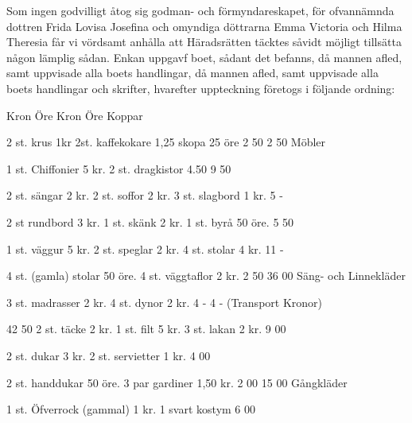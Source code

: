 Som ingen godvilligt åtog sig godman- och förmyndareskapet, för ofvannämnda dottren Frida Lovisa Josefina och omyndiga döttrarna Emma Victoria och Hilma Theresia får vi vördsamt anhålla att Häradsrätten täcktes såvidt möjligt tillsätta någon lämplig sådan. Enkan uppgavf boet, sådant det befanns, då mannen afled, samt uppvisade alla boets handlingar, då mannen afled, samt uppvisade alla boets handlingar och skrifter, hvarefter uppteckning företogs i följande ordning:




	Kron
	Öre
	Kron
	Öre
	Koppar
	

	

	

	

	2 st. krus 1kr 2st. kaffekokare 1,25 skopa 25 öre
	2
	50
	2
	50
	Möbler
	

	

	

	

	1 st. Chiffonier 5 kr. 2 st. dragkistor 4.50 
	9
	50
	

	

	2 st. sängar 2 kr. 2 st. soffor 2 kr. 3 st. slagbord  1 kr.
	5
	-
	

	

	2 st rundbord 3 kr. 1 st. skänk 2 kr. 1 st. byrå 50 öre.
	5
	50
	

	

	1 st. väggur 5 kr. 2 st. speglar 2 kr. 4 st. stolar 4 kr.
	11
	-
	

	

	4 st. (gamla) stolar 50 öre. 4 st. väggtaflor 2 kr. 
	2
	50
	36
	00
	Säng- och Linnekläder
	

	

	

	

	3 st. madrasser 2 kr. 4 st. dynor 2 kr. 
	4
	-
	4
	-
	(Transport Kronor)
	

	

	42
	50
	2 st. täcke 2 kr. 1 st. filt 5 kr. 3 st. lakan 2 kr. 
	9
	00
	

	

	2 st. dukar 3 kr. 2 st. servietter 1 kr.
	4
	00
	

	

	2 st. handdukar 50 öre. 3 par gardiner 1,50 kr.
	2
	00
	15
	00
	Gångkläder
	

	

	

	

	1 st. Öfverrock (gammal) 1 kr. 1 svart kostym
	6
	00
	

